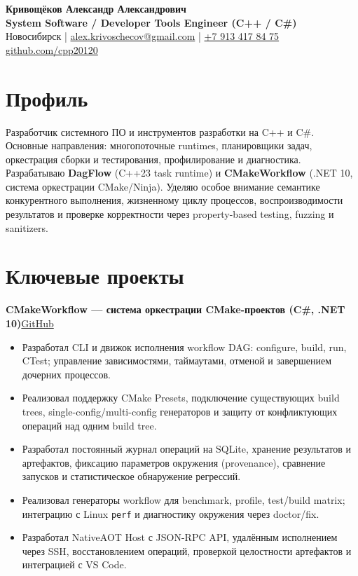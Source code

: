 \documentclass[a4paper,10pt]{article}
\newcommand{\project}[3]{%
    \noindent\textbf{#1}\hfill\href{#2}{#3}\par
}
\begin{document}
\begin{center}
    {\Large\bfseries Кривощёков Александр Александрович}\\[3pt]
    {\bfseries System Software / Developer Tools Engineer (C++ / C\#)}\\[4pt]

    Новосибирск \quad | \quad
    \href{mailto:alex.krivoschecov@gmail.com}
         {alex.krivoschecov@gmail.com}
    \quad | \quad
    \href{tel:+79134178475}{+7 913 417 84 75}\\[2pt]

    \href{https://github.com/cpp20120}{github.com/cpp20120}
\end{center}

\section*{Профиль}

Разработчик системного ПО и инструментов разработки на C++ и C\#.
Основные направления: многопоточные runtimes, планировщики задач,
оркестрация сборки и тестирования, профилирование и диагностика.
Разрабатываю \textbf{DagFlow} (C++23 task runtime) и
\textbf{CMakeWorkflow} (.NET 10, система оркестрации CMake/Ninja).
Уделяю особое внимание семантике конкурентного выполнения,
жизненному циклу процессов, воспроизводимости результатов
и проверке корректности через property-based testing,
fuzzing и sanitizers.


\section*{Ключевые проекты}

\project
    {CMakeWorkflow --- система оркестрации CMake-проектов (C\#, .NET 10)}
    {https://github.com/cpp20120/CMakeWorkflow}
    {GitHub}

\begin{itemize}
    \item Разработал CLI и движок исполнения workflow DAG:
    configure, build, run, CTest; управление зависимостями,
    таймаутами, отменой и завершением дочерних процессов.

    \item Реализовал поддержку CMake Presets, подключение существующих
    build trees, single-config/multi-config генераторов
    и защиту от конфликтующих операций над одним build tree.

    \item Разработал постоянный журнал операций на SQLite,
    хранение результатов и артефактов, фиксацию параметров
    окружения (provenance), сравнение запусков
    и статистическое обнаружение регрессий.

    \item Реализовал генераторы workflow для benchmark,
    profile, test/build matrix; интеграцию с Linux
    \texttt{perf} и диагностику окружения через doctor/fix.

    \item Разработал NativeAOT Host с JSON-RPC API,
    удалённым исполнением через SSH, восстановлением операций,
    проверкой целостности артефактов и интеграцией с VS Code.
\end{itemize}
\end{document}
